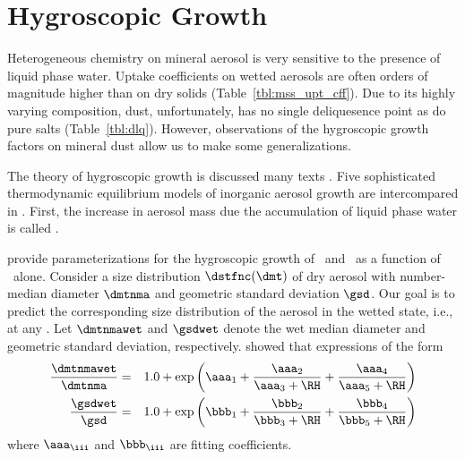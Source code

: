 \documentclass[12pt,twoside]{book}
\begin{document}
\section[Hygroscopic Growth]{Hygroscopic Growth}\label{sxn:hyg}
Heterogeneous chemistry on mineral aerosol is very sensitive to the
presence of liquid phase water. 
Uptake coefficients on wetted aerosols are often orders of magnitude
higher than on dry solids (Table~\ref{tbl:mss_upt_cff}).
Due to its highly varying composition, dust, unfortunately, has no
single deliquesence point as do pure salts (Table~\ref{tbl:dlq}).
However, observations of the hygroscopic growth factors on mineral
dust allow us to make some generalizations.

The theory of hygroscopic growth is discussed many texts
\cite[e.g.,][]{Han76,PrK78,RuD84,SeP97,WKB98}.
Five sophisticated thermodynamic equilibrium models of inorganic
aerosol growth are intercompared in \cite{ZSS00}.
First, the increase in aerosol mass due the accumulation of liquid
phase water is called .

\cite{WKB98} provide parameterizations for the hygroscopic growth of
\HdSOq\ and \NHqdSOq\ as a function of \RH\ alone.
Consider a size distribution $\dstfnc (\dmt)$ of dry aerosol with
number-median diameter $\dmtnma$ and geometric standard deviation
$\gsd$. 
Our goal is to predict the corresponding size distribution of the
aerosol in the wetted state, i.e., at any \RH\@.  
Let $\dmtnmawet$ and $\gsdwet$ denote the wet median diameter and
geometric standard deviation, respectively.
\cite{WKB98} showed that expressions of the form 
\begin{eqnarray}
\frac{\dmtnmawet}{\dmtnma } & = & 1.0 +
\exp \left( \aaa_{1} + \frac{\aaa_{2}}{\aaa_{3} + \RH } + \frac{\aaa_{4}}{
\aaa_{5} + \RH } \right) \\
\frac{\gsdwet}{\gsd } & = & 1.0 +
\exp \left( \bbb_{1} + \frac{\bbb_{2}}{\bbb_{3} + \RH } + \frac{\bbb_{4}}{
\bbb_{5} + \RH } \right)
\label{eqn:hyr_grw_WKB98}
\end{eqnarray}
where $\aaa_{\iii}$ and $\bbb_{\iii}$ are fitting coefficients.
\end{document}
